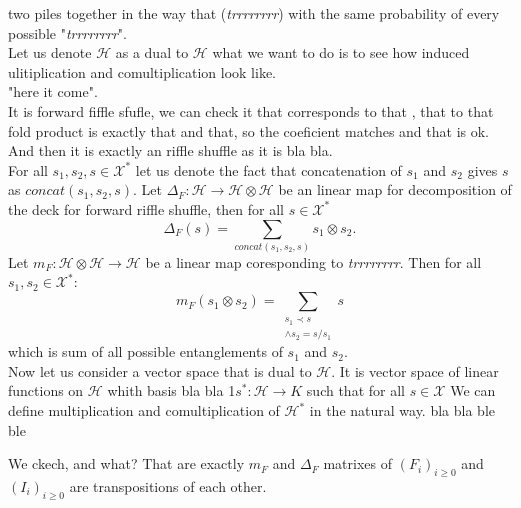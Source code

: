 \documentclass[a4paper, 12pt]{report}
\begin{document}
two piles together in the way that  
(\textit{trrrrrrrr}) with 
the same probability of every possible "\textit{trrrrrrrr}". \\
Let us denote $\mathcal{H}$ as a dual to $\mathcal{H}$ what we want to do is to see how induced 
ulitiplication and comultiplication look like. \\
"here it come". \\
It is forward fiffle sfufle, we can check it 
that corresponds to that , that to that
fold product is exactly that and that, so the coeficient matches and that is ok. \\
And then it is exactly an riffle shuffle as it is bla bla. \\
For all $s_1, s_2, s \in \mathcal{X}^*$ let us denote the fact that concatenation of $s_1$ and $s_2$ gives 
$s$ as $concat(s_1, s_2, s)$.
Let $\Delta_F : \mathcal{H} \to \mathcal{H} \otimes \mathcal{H}$ be an linear map for decomposition 
of the deck for forward riffle shuffle, then for all $s \in \mathcal{X}^*$
\begin{equation*}
\Delta_F(s) = \sum_{concat(s_1, s_2, s)} s_1 \otimes s_2.
\end{equation*}
Let $m_F : \mathcal{H} \otimes \mathcal{H} \to \mathcal{H}$ be a linear map coresponding to 
\textit{trrrrrrrr}. Then for all $s_1, s_2 \in \mathcal{X}^*$:
\begin{equation*}
m_F (s_1 \otimes s_2) = \sum_{\substack{s_1 \prec s \\ \land s_2 = s/s_1} } s
\end{equation*}
which is sum of all possible entanglements of $s_1$ and $s_2$.\\[8pt]
Now let us consider a vector space that is dual to $\mathcal{H}$. It is vector space of linear functions on 
$\mathcal{H}$
whith basis bla bla
1$s^* : \mathcal{H} \to K$ such that for all $s \in \mathcal{X }$
We can define multiplication and comultiplication of $\mathcal{H}^*$ in the natural way.
bla bla
ble ble

We ckech, and what? That are exactly $m_F$ and $\Delta_F$ matrixes of $(F_i)_{i \geq 0}$ and $(I_i)_{i 
\geq 0}$ 
are transpositions of each other.\\
\end{document}
